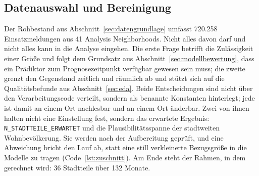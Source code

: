 \documentclass[12pt,a4paper]{article}
\begin{document}
\subsection{Datenauswahl und Bereinigung}
\label{sec:auswahl-bereinigung}

Der Rohbestand aus Abschnitt~\ref{sec:datengrundlage} umfasst 720.258
Einsatzmeldungen aus 41 Analysis Neighborhoods. Nicht alles davon darf und
nicht alles kann in die Analyse eingehen. Die erste Frage betrifft die
Zulässigkeit einer Größe und folgt dem Grundsatz aus
Abschnitt~\ref{sec:modellbewertung}, dass ein Prädiktor zum Prognosezeitpunkt
verfügbar gewesen sein muss; die zweite grenzt den Gegenstand zeitlich und
räumlich ab und stützt sich auf die Qualitätsbefunde aus
Abschnitt~\ref{sec:eda}. Beide Entscheidungen sind nicht über den
Verarbeitungscode verteilt, sondern als benannte Konstanten hinterlegt;
jede ist damit an einem Ort nachlesbar und an
einem Ort änderbar. Zwei von ihnen halten nicht eine Einstellung fest, sondern
das erwartete Ergebnis: \texttt{N\_STADTTEILE\_ERWARTET} und die
Plausibilitätsspanne der stadtweiten Wohnbevölkerung. Sie werden nach der
Aufbereitung geprüft, und eine Abweichung bricht den Lauf ab, statt eine still
verkleinerte Bezugsgröße in die Modelle zu tragen (Code~\ref{lst:zuschnitt}). Am Ende steht der Rahmen, in
dem gerechnet wird: 36 Stadtteile über 132 Monate.
 
\end{document}
